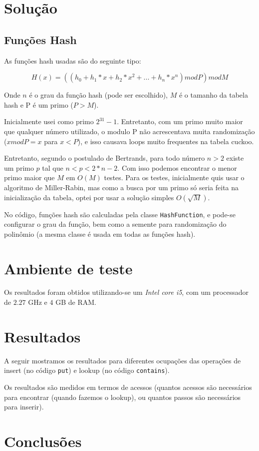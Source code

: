 \documentclass{article}
\begin{document}
\section{Solução}

\subsection{Funções Hash}

As funções hash usadas são do seguinte tipo:

$$ H(x) = ((h_0 + h_1 * x + h_2 * x^2 + ... + h_n * x^n) mod P) mod M $$

Onde $n$ é o grau da função hash (pode ser escolhido), $M$ é o tamanho da tabela hash e P é um
primo ($P > M$).

Inicialmente usei como primo $2^{31} - 1$. Entretanto, com um primo muito maior que qualquer número
utilizado, o modulo P não acrescentava muita randomização ($ x mod P = x$ para $x < P$), e isso
causava loops muito frequentes na tabela cuckoo.

Entretanto, segundo o postulado de Bertrands, para todo número $n > 2$ existe um primo $p$ tal que
$n < p < 2 * n - 2$. Com isso podemos encontrar o menor primo maior que $M$ em $O(M)$ testes. Para
os testes, inicialmente quis usar o algoritmo de Miller-Rabin, mas como a busca por um primo só
seria feita na inicialização da tabela, optei por usar a solução simples $O(\sqrt{M})$.

No código, funções hash são calculadas pela classe \texttt{HashFunction}, e pode-se configurar o
grau da função, bem como a semente para randomização do polinômio (a mesma classe é usada em todas
as funções hash).

\section{Ambiente de teste}

Os resultados foram obtidos utilizando-se um \emph{Intel core i5}, com um processador de $2.27$ GHz
e $4$ GB de RAM.

\section{Resultados}

A seguir mostramos os resultados para diferentes ocupações das operações de insert (no código
\texttt{put}) e lookup (no código \texttt{contains}).

Os resultados são medidos em termos de acessos (quantos acessos são necessários para encontrar
(quando fazemos o lookup), ou quantos passos são necessários para inserir).

\section{Conclusões}
\end{document}
